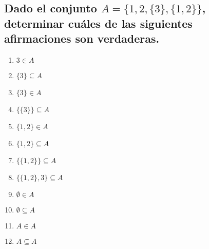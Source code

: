 \documentclass{article}
\begin{document}
\subsection{Dado el conjunto \texorpdfstring{$A = \{1, 2, \{3\}, \{1,2\}\}$}{A = {1, 2, {3}, {1,2}}}, determinar cuáles de las siguientes afirmaciones son verdaderas.}

\begin{multicols}{2}
\begin{enumerate}[label=\roman*)]
    \item $3 \in A$
    \item $\{3\} \subseteq A$
    \item $\{3\} \in A$
    \item $\{\{3\}\} \subseteq A$
    \item $\{1,2\} \in A$
    \item $\{1,2\} \subseteq A$
    \item $\{\{1,2\}\} \subseteq A$
    \item $\{\{1,2\}, 3\} \subseteq A$
    \item $\emptyset \in A$
    \item $\emptyset \subseteq A$
    \item $A \in A$
    \item $A \subseteq A$
\end{enumerate}
\end{multicols}
\end{document}

